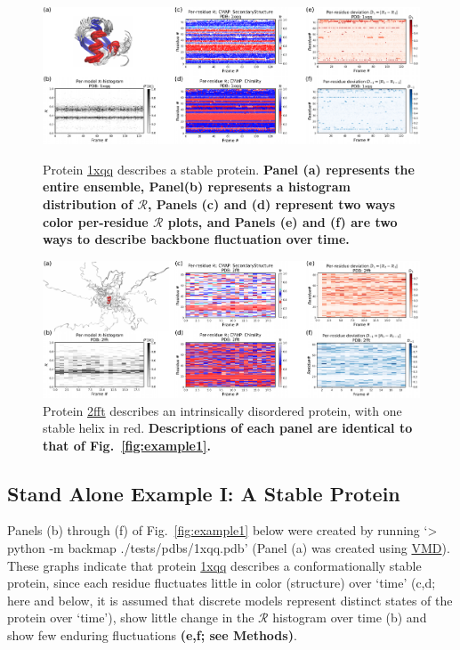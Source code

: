 \documentclass[fleqn,10pt,lineno]{wlpeerj} %
\newcommand{\Fig}[1]{Fig.~\ref{#1}}
\newcommand{\n}[1]{{\textbf{\color{red}#1}}}
\newcommand{\rr}{$\mathcal{R}$\xspace}
\begin{document}
\begin{figure}[t!]
\includegraphics[width=1.0\linewidth]{figures/1xqq_spread.pdf}
\caption{Protein \href{https://www.rcsb.org/structure/1XQQ}{1xqq} describes a stable protein. \n{Panel (a) represents the entire ensemble, Panel(b) represents a histogram distribution of \rr, Panels (c) and (d) represent two ways color per-residue \rr plots, and Panels (e) and (f) are two ways to describe backbone fluctuation over time.}\label{fig:example1}} 
\includegraphics[width=1.0\linewidth]{figures/2fft_spread.pdf}
\caption{Protein \href{https://www.rcsb.org/structure/2FFT}{2fft} describes an intrinsically disordered protein, with one stable helix in red.
\n{Descriptions of each panel are identical to that of \Fig{fig:example1}.}\label{fig:example2}} 
\end{figure}

\subsection*{Stand Alone Example I: A Stable Protein}

Panels (b) through (f) of \Fig{fig:example1} below were created by running `> python -m backmap ./tests/pdbs/1xqq.pdb' (Panel (a) was created using \href{http://www.ks.uiuc.edu/Research/vmd/}{VMD}). These graphs indicate that protein \href{https://www.rcsb.org/structure/1XQQ}{1xqq} describes a conformationally stable protein, since each residue fluctuates little in color (structure) over `time' (c,d; here and below, it is assumed that discrete models represent distinct states of the protein over `time'), show little change in the \rr histogram over time (b) and show few enduring fluctuations \n{(e,f; see Methods)}. 
\end{document}
